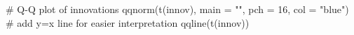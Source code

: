 \begin{Schunk}
\begin{Sinput}
 # Q-Q plot of innovations
 qqnorm(t(innov), main = "", pch = 16, col = "blue")
 # add y=x line for easier interpretation
 qqline(t(innov))
\end{Sinput}
\end{Schunk}
